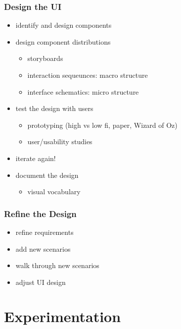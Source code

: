 \documentclass[]{article}
\theoremstyle{definition}
\begin{document}
					\subsubsection{Design the UI}
						\begin{itemize}
							\item identify and design components
							\item design component distributions
								\begin{itemize}
									\item storyboards
									\item interaction sequeunces: macro structure
									\item interface schematics: micro structure
								\end{itemize}
							\item test the design with users
								\begin{itemize}
									\item prototyping (high vs low fi, paper, Wizard of Oz)
									\item user/usability studies
								\end{itemize}
							\item iterate again!
							\item document the design
								\begin{itemize}
									\item visual vocabulary
								\end{itemize}
						\end{itemize}
					\subsubsection{Refine the Design}
						\begin{itemize}
							\item refine requirements
							\item add new scenarios
							\item walk through new scenarios
							\item adjust UI design
						\end{itemize}

	\section{Experimentation}
\end{document}
